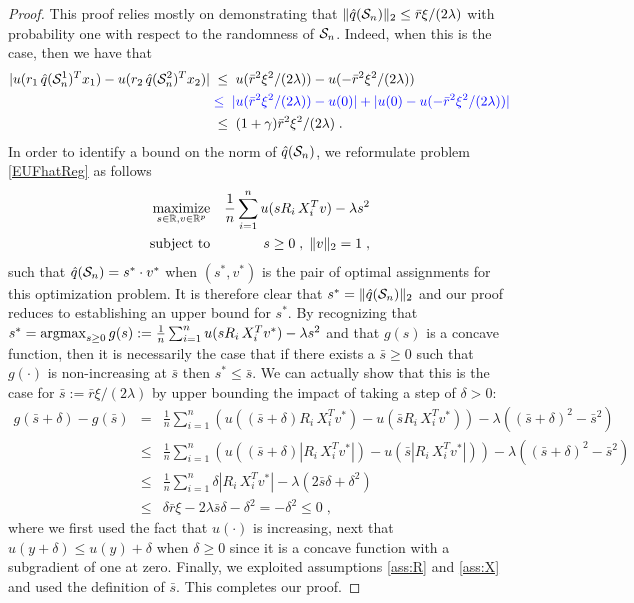\documentclass[]{interact}
\theoremstyle{plain}%
\theoremstyle{definition}
\theoremstyle{remark}
\def\maximize{\mathop{\rm maximize}}
\def\subto{{\rm subject \mbox{   }\rm to}}
\def\argmax{\mathop{\rm argmax}}
\newcommand{\0}{\V{0}}
\newcommand{\1}{\V{1}}
\renewcommand{\Re}{\mathbb{R}}
\newcommand{\modified}[1]{{\color{blue} #1}}
\theoremstyle{plain}
\theoremstyle{definition}
\begin{document}
\begin{proof}
  This proof relies mostly on demonstrating that $\|{\hat{q}}(\mathcal{S}_n)\|_2\leq \bar{r}\xi/(2\lambda)$
  with probability one with respect to the randomness of $\mathcal{S}_n$. Indeed, when this is the case,
  then we have that
  \begin{align*}
    |u(r_1\,\qhat(\Sn^1)^T x_1)-u(r_2\,\qhat(\Sn^2)^T x_2)| &\;\leq\; u(\bar{r}^2\xi^2/(2\lambda) )-u(- \bar{r}^2\xi^2/(2\lambda))\\
    &\modified{\;\leq\;|u(\bar{r}^2\xi^2/(2\lambda) )-u(0)|+|u(0)-u(-\bar{r}^2\xi^2/(2\lambda))|}\\
    &\;\leq\; (1+\gamma)\bar{r}^2\xi^2/(2\lambda)     \;.
  \end{align*}
  In order to identify a bound on the norm of ${\hat{q}}(\mathcal{S}_n)$, we reformulate problem
  \eqref{EUFhatReg} as follows
  \begin{eqnarray*}
    \maximize_{s\in\Re,v\in\Re^p} && \frac{1}{n}\sum_{i=1}^n u(s R_i\,X_i^T v) - \lambda s^2\\
    \subto&& s\geq0\;,\;\|v\|_2=1\;,
  \end{eqnarray*}
  such that ${\hat{q}}(\mathcal{S}_n) =s^*\cdot v^*$ when $(s^*,v^*)$ is the pair of optimal
  assignments for this optimization problem. It is therefore clear that
  $s^*=\|{\hat{q}}(\mathcal{S}_n)\|_2$ and our proof reduces to establishing an upper bound for $s^*$.
  By recognizing that
  $s^*=\argmax_{s\geq 0} g(s):=\frac{1}{n}\sum_{i=1}^n u(s R_i\,X_i^T v^*) - \lambda s^2$
  and that $g(s)$ is a concave function, then it is necessarily the case that if there
  exists a $\bar{s}\geq 0$ such that $g(\cdot)$ is non-increasing at $\bar{s}$ then
  $s^* \leq \bar{s}$. We can actually show that this is the case for
  $\bar{s}:= \bar{r}\xi/(2\lambda)$ by upper bounding the impact of taking a step of
  $\delta>0$:
  \begin{eqnarray*}
    g(\bar{s}+\delta)-g(\bar{s}) &=& \frac{1}{n}\sum_{i=1}^n (u((\bar{s}+\delta) R_i\,X_i^T v^*) - u(\bar{s} R_i\,X_i^T v^*) ) - \lambda ((\bar{s}+\delta)^2-\bar{s}^2)\\
                                 &\leq& \frac{1}{n}\sum_{i=1}^n (u((\bar{s}+\delta) |R_i\,X_i^T v^*|) - u(\bar{s} |R_i\,X_i^T v^*|) ) - \lambda ((\bar{s}+\delta)^2-\bar{s}^2)\\
                                 &\leq & \frac{1}{n}\sum_{i=1}^n  \delta |R_i\,X_i^T v^*| - \lambda (2\bar{s}\delta + \delta^2)\\
                                 &\leq &  \delta \bar{r} \xi  - 2\lambda \bar{s}\delta -  \delta^2 = -  \delta^2 \leq 0\;,
  \end{eqnarray*}
  where we first used the fact that $u(\cdot)$ is increasing, next that
  $u(y+\delta)\leq u(y)+\delta$ when $\delta\geq 0$ since it is a concave function with a
  subgradient of one at zero.  Finally, we exploited assumptions \ref{ass:R} and
  \ref{ass:X} and used the definition of $\bar{s}$. This completes our proof.
\end{proof}
\end{document}
